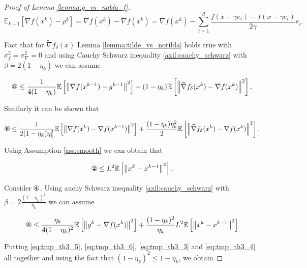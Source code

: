 \begin{proof}[Proof of Lemma \ref{lemma:g_vs_nabla_f}]
        \begin{equation*}
            \mathbb{E}_{k - 1} \left[\nabla f(x^k) - \rho^k \right] = \nabla f(x^k) - \widetilde{\nabla} f(x^k) = \nabla f(x^k) - \sum\limits_{i = 1}^d \frac{f(x + \gamma e_i) - f(x - \gamma e_i)}{2 \gamma} e_i.
        \end{equation*}

        Fact that for $\widetilde{\nabla} f_\delta(x)$ Lemma \ref{lemma:tilde_vs_notilda} holds true with $\sigma_f^2 = \sigma_\nabla^2 = 0$ and using Cauchy Schwarz inequality \ref{axil:cauchy_schwarz} with $\beta = 2 (1 - \eta_k)$ we can assume

        \begin{equation}
        \label{eq:tmp_th3_5}
            \circledFive \leq \frac{1}{4(1 - \eta_k)} \expect{\norms{\nabla f(x^{k-1}) - g^{k-1}}^2} + (1 - \eta_k) \expect{\norms{\widetilde{\nabla} f_\delta(x^k) - \nabla f(x^k)}^2}.
        \end{equation}

        Similarly it can be shown that 

        \begin{equation}
        \label{eq:tmp_th3_6}
            \circledSix \leq \frac{1}{2 (1 - \eta_k) \eta_k^2} \expect{\norms{\nabla f(x^k) - \nabla f(x^{k-1})}^2} 
            +
            \frac{(1 - \eta_k) \eta_k^2}{2} \expect{\norms{\widetilde{\nabla} f_\delta(x^k) - \nabla f(x^k)}^2}.
        \end{equation}

        Using Assumption \ref{ass:smooth} we can obtain that 

        \begin{equation}
        \label{eq:tmp_th3_3}
            \circledTwo \leq L^2 \expect{\norms{x^k - x^{k-1}}^2}.
        \end{equation}

        Consider $\circledFour$. Using auchy Schwarz inequality \ref{axil:cauchy_schwarz} with $\beta = 2 \frac{(1 - \eta_k)^2}{\eta_k}$ we can assume

        \begin{equation}
        \label{eq:tmp_th3_4}
            \circledFour \leq \frac{\eta_k}{4 (1 - \eta_k)^2} \expect{\norms{g^k - \nabla f(x^k)}^2}
            +
            \frac{(1 - \eta_k)^2}{\eta_k} L^2 \expect{\norms{x^k - x^{k-1}}^2}
        \end{equation}

        Putting \eqref{eq:tmp_th3_5}, \eqref{eq:tmp_th3_6}, \eqref{eq:tmp_th3_3} and \eqref{eq:tmp_th3_4} all together and using the fact that $(1 -\eta_k)^2 \leq 1 - \eta_k$, we obtain


\end{proof}
